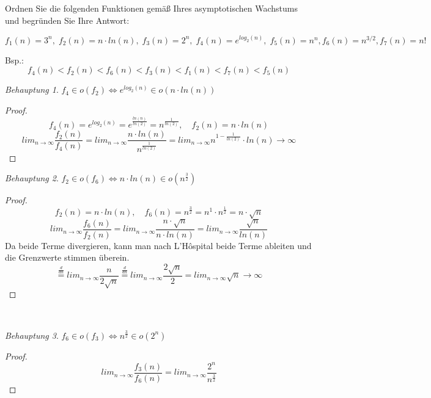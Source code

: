 \documentclass[12pt]{article}
\theoremstyle{remark}
\newtheorem*{Behauptung}{Behauptung}
\begin{document}
\section{}

Ordnen Sie die folgenden Funktionen gemäß Ihres asymptotischen Wachstums und begründen Sie Ihre Antwort:

\[
f_1(n) = 3^n, \; f_2(n) = n \cdot ln(n), \; f_3(n) = 2^n, \; f_4(n) = e^{log_2(n)}, \; f_5(n) = n^n, f_6(n) = n^{3/2}, f_7(n) = n!
\]

Bsp.: \\
\[
f_4(n) < f_2(n) < f_6(n) < f_3(n) < f_1(n) < f_7(n) < f_5(n)
\]
\begin{Behauptung}
$f_4 \in o(f_2) \iff e^{log_2(n)} \in o(n \cdot ln(n))$
\end{Behauptung}
\begin{proof}
\[
f_4(n) = e^{log_2(n)} = e^\frac{ln(n)}{ln(2)} = n^\frac{1}{ln(2)}, \quad f_2(n) = n \cdot ln(n)
\]
\[
lim_{n\rightarrow \infty}\frac{f_2(n)}{f_4(n)}
= lim_{n\rightarrow \infty}\frac{n \cdot ln(n)}{n^\frac{1}{ln(2)}}
= lim_{n\rightarrow \infty}n^{1-\frac{1}{ln(2)}} \cdot ln(n) \rightarrow \infty
\]
\end{proof}

\begin{Behauptung}
$f_2 \in o(f_6) \iff n \cdot ln(n) \in o(n^\frac{3}{2})$
\end{Behauptung}
\begin{proof}
\[
f_2(n) = n \cdot ln(n), \quad f_6(n) = n^\frac{3}{2} = n^1 \cdot n^\frac{1}{2} = n \cdot \sqrt{n}
\]
\[
lim_{n\rightarrow \infty}\frac{f_6(n)}{f_2(n)}
= lim_{n\rightarrow \infty}\frac{n \cdot \sqrt{n}}{n \cdot ln(n)}
= lim_{n\rightarrow \infty}\frac{\sqrt{n}}{ln(n)}
\]
Da beide Terme divergieren, kann man nach L'Hôspital beide Terme ableiten und die Grenzwerte stimmen überein.
\[
\stackrel{\frac{d}{dn}}{=} lim_{n\rightarrow \infty}\frac{n}{2\sqrt{n}}
\stackrel{\frac{d}{dn}}{=} lim_{n\rightarrow \infty}\frac{2\sqrt{n}}{2}
= lim_{n\rightarrow \infty}\sqrt{n}
\rightarrow \infty
\]

\end{proof}
\\
\begin{Behauptung}
$f_6 \in o(f_3) \iff n^\frac{3}{2} \in o(2^n)$
\end{Behauptung}
\begin{proof}
\[
lim_{n\rightarrow \infty}\frac{f_3(n)}{f_6(n)}
= lim_{n\rightarrow \infty}\frac{2^n}{n^\frac{3}{2}}
\]

\end{proof}
\end{document}
